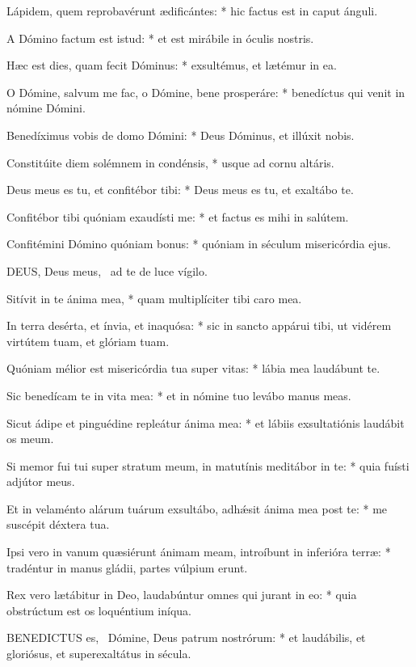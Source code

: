 Lápidem, quem reprobavérunt ædificántes: * hic factus est in caput ánguli.

A Dómino factum est istud: * et est mirábile in óculis nostris.

Hæc est dies, quam fecit Dóminus: * exsultémus, et lætémur in ea.

O Dómine, salvum me fac, o Dómine, bene prosperáre: * benedíctus qui venit in nómine Dómini.

Benedíximus vobis de domo Dómini: * Deus Dóminus, et illúxit nobis.

Constitúite diem solémnem in condénsis, * usque ad cornu altáris.

Deus meus es tu, et confitébor tibi: * Deus meus es tu, et exaltábo te.

Confitébor tibi quóniam exaudísti me: * et factus es mihi in salútem.

Confitémini Dómino quóniam bonus: * quóniam in séculum misericórdia ejus.


\lettrine[lines=2]{D}{EUS}, Deus meus, \textdagger\ ad te de luce vígilo.

Sitívit in te ánima mea, * quam multiplíciter tibi caro mea.

In terra desérta, et ínvia, et inaquósa: * sic in sancto appárui tibi, ut vidérem virtútem tuam, et glóriam tuam.

Quóniam mélior est misericórdia tua super vitas: * lábia mea laudábunt te.

Sic benedícam te in vita mea: * et in nómine tuo levábo manus meas.

Sicut ádipe et pinguédine repleátur ánima mea: * et lábiis exsultatiónis laudábit os meum.

Si memor fui tui super stratum meum, in matutínis meditábor in te: * quia fuísti adjútor meus.

Et in velaménto alárum tuárum exsultábo, adhǽsit ánima mea post te: * me suscépit déxtera tua.

Ipsi vero in vanum quæsiérunt ánimam meam, introíbunt in inferióra terræ: * tradéntur in manus gládii, partes vúlpium erunt.

Rex vero lætábitur in Deo, laudabúntur omnes qui jurant in eo: * quia obstrúctum est os loquéntium iníqua.


\lettrine[lines=2]{B}{ENEDICTUS} es, \textdagger\ Dómine, Deus patrum nostrórum: * et laudábilis, et gloriósus, et superexaltátus in sécula.

